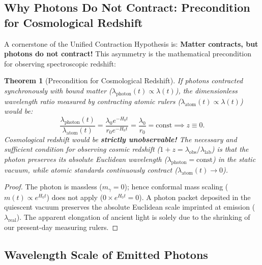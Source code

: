 \documentclass[11pt,a4paper]{article}
\newtheorem{theorem}{Theorem}[section]
\begin{document}
\subsection{Why Photons Do Not Contract: Precondition for Cosmological Redshift}
\label{sec:foton_neden_buzulmez_em}

A cornerstone of the Unified Contraction Hypothesis is: \textbf{Matter contracts, but photons do not contract!} This asymmetry is the mathematical precondition for observing spectroscopic redshift:

\begin{theorem}[Precondition for Cosmological Redshift]
    \label{thm:kirmiziya_kayma_varlik_sarti_p2}
    If photons contracted synchronously with bound matter ($\lambda_{\mathrm{photon}}(t) \propto \lambda(t)$), the dimensionless wavelength ratio measured by contracting atomic rulers ($\lambda_{\mathrm{atom}}(t) \propto \lambda(t)$) would be:
    \begin{equation}
        \frac{\lambda_{\mathrm{photon}}(t)}{\lambda_{\mathrm{atom}}(t)} = \frac{\lambda_0 e^{-H_0 t}}{r_0 e^{-H_0 t}} = \frac{\lambda_0}{r_0} = \text{const} \implies z \equiv 0.
    \end{equation}
    Cosmological redshift would be \textbf{strictly unobservable!} The necessary and sufficient condition for observing cosmic redshift ($1+z = \lambda_{\mathrm{obs}}/\lambda_{\mathrm{lab}}$) is that the photon preserves its absolute Euclidean wavelength ($\lambda_{\mathrm{photon}} = \text{const}$) in the static vacuum, while atomic standards continuously contract ($\lambda_{\mathrm{atom}}(t) \to 0$).
\end{theorem}

\begin{proof}
    The photon is massless ($m_\gamma = 0$); hence conformal mass scaling ($m(t) \propto e^{H_0 t}$) does not apply ($0 \times e^{H_0 t} = 0$). A photon packet deposited in the quiescent vacuum preserves the absolute Euclidean scale imprinted at emission ($\lambda_{\text{real}}$). The apparent elongation of ancient light is solely due to the shrinking of our present-day measuring rulers.
\end{proof}

\subsection{Wavelength Scale of Emitted Photons}
\label{sec:fotonlar_neden_devasa_degil_em}
\end{document}
